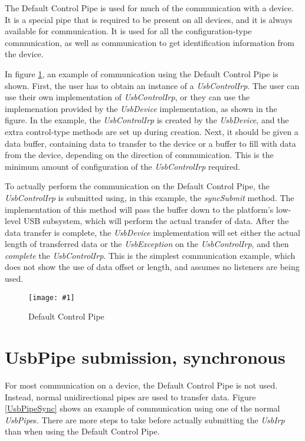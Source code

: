 \documentclass{article}
\newcommand{\myclass}[1]{\emph{#1}}
\newcommand{\myinterface}[1]{\emph{#1}}
\newcommand{\mymethod}[1]{\emph{#1}}
\newcommand{\mysectionend}[0]{\vfill\pagebreak[1]}
\newcommand{\myfigure}[3]{\begin{figure}[htbp]\centering\texttt{[image: \#1]}\caption{#2}\label{#3}\end{figure}}
\begin{document}
The Default Control Pipe is used for much of the communication with a device.
It is a special pipe that is required to be present on all devices, and it is
always available for communication.  It is used for all the configuration-type
communication, as well as communication to get identification information from
the device.

In figure \ref{DCP}, an example of communication using the Default Control Pipe
is shown.  First, the user has to obtain an instance of a \myinterface{UsbControlIrp}.  The
user can use their own implementation of \myinterface{UsbControlIrp}, or they can use the
implemenation provided by the \myinterface{UsbDevice} implementation, as shown in the figure.
In the example, the \myinterface{UsbControlIrp} is created by the \myinterface{UsbDevice}, and the extra
control-type methods are set up during creation.  Next, it should be given
a data buffer, containing data to transfer to the device or a buffer to
fill with data from the device, depending on the direction of communication.
This is the minimum amount of configuration of the \myinterface{UsbControlIrp} required.

To actually perform the communication on the Default Control Pipe, the
\myinterface{UsbControlIrp} is submitted using, in this example, the \mymethod{syncSubmit}
method.  The implementation of this method will pass the buffer down to the
platform's low-level USB subsystem, which will perform the actual transfer of
data.  After the data transfer is complete, the \myinterface{UsbDevice} implementation will
set either the actual length of transferred data or the \myclass{UsbException} on the
\myinterface{UsbControlIrp}, and then \mymethod{complete} the \myinterface{UsbControlIrp}.  This is the
simplest communication example, which does not show the use of data offset or
length, and assumes no listeners are being used.

\myfigure{figs/DCP}{Default Control Pipe}{DCP}

\mysectionend

%

\section{UsbPipe submission, synchronous}

For most communication on a device, the Default Control Pipe is not used.
Instead, normal unidirectional pipes are used to transfer data.  Figure
\ref{UsbPipeSync} shows an example of communication using one of the normal
\myinterface{UsbPipe}s.  There are more steps to take before actually submitting the \myinterface{UsbIrp}
than when using the Default Control Pipe.
\end{document}
